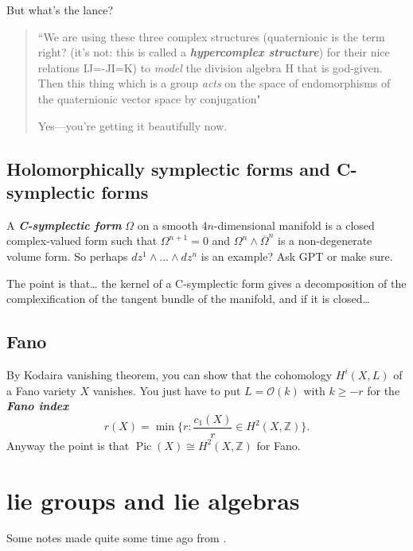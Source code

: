 But what's the lance?
\begin{quotation}
	``We are using these three complex structures (quaternionic is the term right? (it's not: this is called a \textit{\textbf{hypercomplex structure}}) for their nice relations IJ=-JI=K) to \textit{model} the division algebra H that is god-given. Then this thing which is a group \textit{acts} on the space of endomorphisms of the quaternionic vector space by conjugation"

	\vspace{1em}
	\hfill Yes---you're getting it beautifully now.
\end{quotation}

\section{Holomorphically symplectic forms and C-symplectic forms}

A \textit{\textbf{C-symplectic form}} \(\Omega\) on a smooth 4\(n\)-dimensional manifold is a closed complex-valued form such that \(\Omega^{n+1}=0\) and \(\Omega^n \wedge \overline{ \Omega}^n\) is a non-degenerate volume form. So perhaps \(dz^1 \wedge \ldots \wedge dz^n\) is an example? Ask GPT or make sure.

The point is that… the kernel of a C-symplectic form gives a decomposition of the complexification of the tangent bundle of the manifold, and if it is closed…



\section{Fano}

\begin{exercise}\leavevmode
By Kodaira vanishing theorem, you can show that the cohomology \(H^{i}(X,L)\) of a Fano variety \(X\) vanishes. You just have to put \(L=\mathcal{O}(k)\) with \(k\geq  -r\) for the \textit{\textbf{Fano index}} 
\[r(X)=\operatorname{min}\{r:\frac{c_1(X)}{r}\in H^{2}(X,\mathbb{Z})\}.\]
Anyway the point is that \(\operatorname{Pic}(X)\cong H^{2}(X,\mathbb{Z})\) for Fano.
\end{exercise}

\chapter{lie groups and lie algebras}

Some notes made quite some time ago from  \cite{les}.


